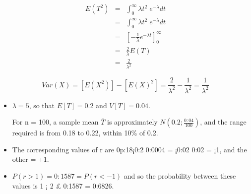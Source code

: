\documentclass[a4paper,12pt]{article}
\begin{document}
\begin{enumerate}
\begin{eqnarray*}
E(T^2) &=& \int^{\infty}_{0} \lambda t^2\;e^{-\lambda} dt \\
    &=&\int^{\infty}_{0} \lambda t^2\;e^{-\lambda} dt \\
    &=& \left[ -\frac{1}{\lambda}e^{-\lambda t} \right]^{\infty}_{0}\\
    &=& \frac{2}{\lambda}E(T)\\
    &=& \frac{2}{\lambda^2}  
\end{eqnarray*}

\[ Var(X) = [E(X^2)] - [E(X)^2] = \frac{2}{\lambda^2} - \frac{1}{\lambda^2} 
     = \frac{1}{\lambda^2} \]
\begin{itemize}
\item $\lambda = 5$, so that $E[T] = 0.2$ and $V[T] = 0.04$. 

 For n = 100, a sample mean
$\bar{T}$ is approximately $N(0.2; \frac{0:04}{100})$, and the range required is from 0.18 to 0.22,
within 10\% of 0.2. 
\item The corresponding values of r are 0p:18¡0:2
0:0004
= ¡0:02
0:02 = ¡1,
and the other = +1. 
\item $P(r > 1) = 0:1587 = P(r < -1)$ and so the probability
between these values is 1 ¡ 2 £ 0:1587 = 0:6826.
\end{itemize}
\end{enumerate}
\end{document}

